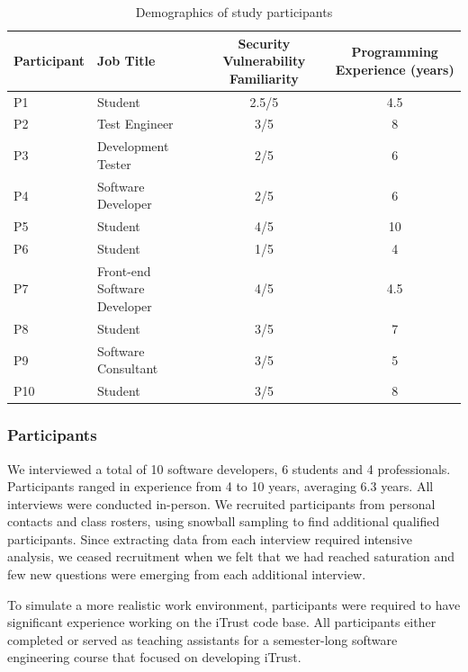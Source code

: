 \documentclass[conference]{IEEEtran}
\begin{document}
\begin{table} 
\centering
\caption{Demographics of study participants}
\begin{tabular}{|l|l|c|c|}
\rowcolor{gray!50}
\hline
    Participant			& Job Title 						& Security Vulnerability Familiarity 					& Programming Experience (years) \\
    \hline
    P1			    	& Student     			& 2.5/5												 	&  4.5    \\
    \hline
    P2			    	& Test Engineer    			& 3/5									    			&  8 		\\
    \hline
    P3 					& Development Tester       			& 2/5													&  6 	    	\\
    \hline
    P4					& Software Developer     			& 2/5				 									&  6     	\\
    \hline
    P5					& Student      			& 4/5													&  10 	\\
    \hline
    P6					& Student		    				& 1/5							    					& 4		\\
    \hline
    P7					& Front-end Software Developer    	& 4/5													& 4.5              \\
    \hline
    P8					& Student	    		& 3/5													& 7   \\
    \hline
    P9					& Software Consultant   	 		& 3/5													& 5	  		 \\
    \hline
    P10			    	& Student    			& 3/5										 			& 8	              \\
    \hline
\end{tabular}
\label{table:participants}
\end{table}



\subsubsection{Participants}

We interviewed a total of 10 software developers, 6 students and 4 professionals. Participants ranged in experience from 4 to 10 years, averaging 6.3 years.
All interviews were conducted in-person.
We recruited participants from personal contacts and class rosters, using snowball sampling to find additional qualified participants.
Since extracting data from each interview required intensive analysis, we ceased recruitment when we felt that we had reached saturation and few new questions were emerging from each additional interview.

To simulate a more realistic work environment, participants were required to have significant experience working on the iTrust code base. 
All participants either completed or served as teaching assistants for a semester-long software engineering course that focused on developing iTrust.
\end{document}
